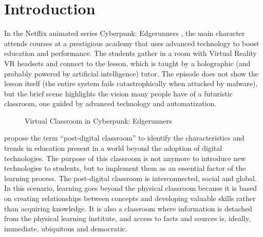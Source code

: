 \chapter{Introduction}

In the Netflix animated series Cyberpunk: Edgerunners \parencite{cyberpunk_2022}, the main character attends courses at a 
prestigious academy that uses advanced technology to boost education and performance. The students gather in a room with
Virtual Reality \ac{VR} headsets and connect to the lesson, which is taught by a holographic (and probably powered by artificial
intelligence) tutor. The episode does not show the lesson itself (the entire system fails catastrophically when attacked by
malware), but the brief scene highlights the vision many people have of a futuristic classroom, one guided by advanced technology
and automatization.

\begin{figure}[t]
    \caption{Virtual Classroom in Cyberpunk: Edgerunners\label{fig:1-1}}
\end{figure}

\textcite{forsler_2024} propose the term “post-digital classroom” to identify the characteristics and trends in education
present in a world beyond the adoption of digital technologies. The purpose of this classroom is not anymore to
introduce new technologies to students, but to implement them as an essential factor of the learning process. The
post-digital classroom is interconnected, social and global. In this scenario, learning goes beyond the physical
classroom because it is based on creating relationships between concepts and developing valuable skills rather than
acquiring knowledge. It is also a classroom where information is detached from the physical learning institute, and
access to facts and sources is, ideally, immediate, ubiquitous and democratic.


